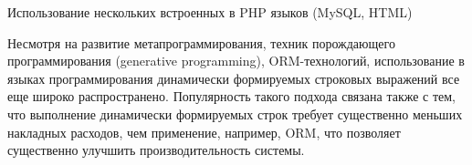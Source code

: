 \begin{listing}
\caption{Использование нескольких встроенных в PHP языков (MySQL, HTML)}
\label{lst:PhPSqlHtml}
\end{listing}


Несмотря на развитие метапрограммирования, техник порождающего программирования (generative programming), ORM-технологий, использование в языках программирования динамически формируемых строковых 
выражений все еще широко распространено. Популярность такого подхода связана также с тем, что выполнение динамически формируемых строк требует существенно меньших накладных расходов, чем применение, 
например, ORM, что позволяет существенно улучшить производительность системы.

